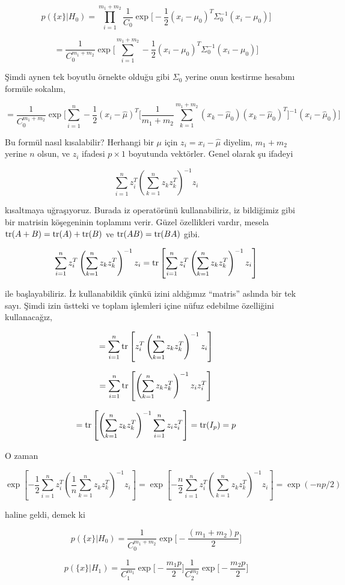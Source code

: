 \documentclass[12pt,fleqn]{article}\usepackage{../../common}
\begin{document}
$$
p(\{x\}|H_0) =
\prod_{i=1}^{m_1+m_2} \frac{1}{C_0}
\exp \bigg[-\frac{ 1}{2}(x_i-\mu_0)^T\Sigma_0^{-1}(x_i-\mu_0) \bigg]
$$

$$ =
\frac{1}{C_0^{m_1+m_2}}
\exp \bigg[\sum_{i=1}^{m_1+m_2} -\frac{ 1}{2}(x_i-\mu_0)^T\Sigma_0^{-1}(x_i-\mu_0) \bigg]
$$

Şimdi aynen tek boyutlu örnekte olduğu gibi $\Sigma_0$ yerine onun kestirme
hesabını formüle sokalım,

$$
= \frac{1}{C_0^{m_1+m_2}} \exp \bigg[\sum_{i=1}^{n} 
-\frac{1}{2}(x_i-\hat{\mu})^T 
\bigg[
\frac{1}{m_1+m_2} \sum_{k=1}^{m_1+m_2} (x_k-\hat{\mu}_0) (x_k-\hat{\mu}_0)^T
\bigg]^{-1}
(x_i-\hat{\mu}_0) \bigg]
$$

Bu formül nasıl kısalabilir? Herhangi bir $\mu$ için $z_i=x_i-\hat{\mu}$
diyelim, $m_1+m_2$ yerine $n$ olsun, ve $z_i$ ifadesi $p \times 1$ boyutunda
vektörler. Genel olarak şu ifadeyi

$$ \sum_{i=1}^n z_i^T\left(\sum_{k=1}^n z_kz_k^T\right)^{-1}z_i $$

kısaltmaya uğraşıyoruz. Burada iz operatörünü kullanabiliriz, iz bildiğimiz gibi
bir matrisin köşegeninin toplamını verir. Güzel özellikleri vardır, mesela
$\operatorname{tr}(A+B)=\operatorname{tr}(A)+\operatorname{tr}(B)$ ve $\operatorname{tr}(AB)=\operatorname{tr}(BA)$ gibi.

$$
\sum_{i=1}^n z_i^T\left(\sum_{k=1}^n z_kz_k^T\right)^{-1}z_i  =
\operatorname{tr}\left[\sum_{i=1}^n z_i^T\left(\sum_{k=1}^n
  z_kz_k^T\right)^{-1}z_i\right] 
$$

ile başlayabiliriz. İz kullanabildik çünkü izini aldığımız ``matris'' aslında
bir tek sayı. Şimdi izin üstteki ve toplam işlemleri içine nüfuz edebilme
özelliğini kullanacağız,

$$= \sum_{i=1}^n\operatorname{tr}\left[ z_i^T\left(\sum_{k=1}^n z_kz_k^T\right)^{-1}z_i\right]$$

$$ = \sum_{i=1}^n\operatorname{tr}\left[ \left(\sum_{k=1}^n z_kz_k^T\right)^{-1}z_iz_i^T\right] $$

$$
= \operatorname{tr}\left[ \left(\sum_{k=1}^n z_kz_k^T\right)^{-1}
\sum_{i=1}^nz_iz_i^T\right] = \operatorname{tr}(I_p)=p 
$$

O zaman 

$$
\exp\left[-\frac12\sum_{i=1}^n z_i^T\left(\frac1n\sum_{k=1}^n
 z_kz_k^T\right)^{-1}z_i\right]  =
\exp\left[-\frac{n}2\sum_{i=1}^n
z_i^T\left(\sum_{k=1}^n z_kz_k^T\right)^{-1}z_i\right]=\exp(-np/2)
$$

haline geldi, demek ki

$$ p(\{x\}|H_0) = \frac{1}{C_0^{m_1+m_2}}\exp\bigg[-\frac{(m_1+m_2)p}{2}\bigg] $$

$$ p(\{x\}|H_1) =
\frac{1}{C_1^{m_1}}\exp\bigg[-\frac{m_1 p}{2}\bigg]
\frac{1}{C_2^{m_2}}\exp\bigg[-\frac{m_2 p}{2}\bigg]
$$
\end{document}
